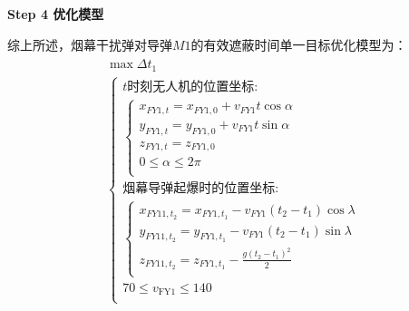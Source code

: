 \documentclass[../main.tex]{subfiles}
\begin{document}
\textbf{Step 4 优化模型}
\par 综上所述，烟幕干扰弹对导弹$M1$的有效遮蔽时间单一目标优化模型为：
\begin{align}
  \begin{array}{c}
	\max \Delta t_1
  \\
\left\{ \begin{array}{l}
	t\text{时刻无人机的位置坐标:}\\
	\left\{ \begin{array}{l}
	x_{FY1,t}=x_{FY1,0}+v_{FY1}t\cos \alpha \\
	y_{FY1,t}=y_{FY1,0}+v_{FY1}t\sin \alpha \\
	z_{FY1,t}=z_{FY1,0}\\
	0\leq \alpha \leq 2\pi \\
\end{array} \right.\\
	\text{烟幕导弹起爆时的位置坐标:}\\
	\left\{ \begin{array}{l}
	x_{FY11,t_2}=x_{FY1,t_1}-v_{FY1}\left( t_2-t_1 \right) \cos \lambda\\
	y_{FY11,t_2}=y_{FY1,t_1}-v_{FY1}\left( t_2-t_1 \right) \sin \lambda\\
	z_{FY11,t_2}=z_{FY1,t_1}-\frac{g\left( t_2-t_1 \right) ^2}{2}\\
\end{array} \right.\\
  70 \leq v_{\text{FY1}} \leq 140\\
\end{array} \right.  
\end{array}
\end{align}










  
\end{document}
